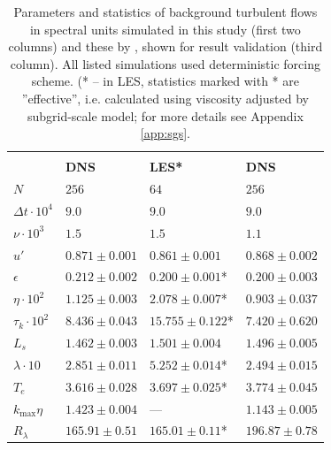 \documentclass{pracamgren}
\begin{document}
\begin{table}[h]
\centering
\begin{tabular}{llll}
 & & & \scriptsize{\textcite{Rosa2013}}  \\
 & \textbf{DNS} & \textbf{LES*} & \textbf{DNS}  \\ \hline
$N$ & $256$ & $64$ & $256$ \\
$\Delta t \cdot 10^{4}$ & $9.0$ & $9.0$ & $9.0$  \\
$\nu \cdot 10^{3}$ & $1.5$ & $1.5$ & $1.1$  \\

$u'$ & $0.871 \pm 0.001 $ & $0.861 \pm 0.001 $ & $0.868 \pm 0.002 $ \\
$\epsilon$ & $0.212 \pm 0.002 $ & $0.200 \pm 0.001$* & $0.200 \pm 0.003 $  \\

$\eta \cdot 10^{2}$ & $1.125 \pm 0.003$ & $2.078 \pm 0.007$* & $0.903 \pm 0.037$  \\
$\tau_{k} \cdot 10^{2}$ & $8.436 \pm 0.043$ & $15.755 \pm 0.122$* & $7.420 \pm 0.620$  \\
$L_{s}$ & $1.462 \pm 0.003$ & $1.501 \pm 0.004$ & $1.496 \pm 0.005$  \\
$\lambda \cdot 10$ & $2.851 \pm 0.011$ & $5.252 \pm 0.014$* & $2.494 \pm 0.015$  \\
$T_{e}$ & $3.616 \pm 0.028$ & $3.697 \pm 0.025$* & $3.774 \pm 0.045$  \\

$k_{\max} \eta$ & $1.423 \pm 0.004 $ & --- & $1.143 \pm 0.005 $  \\
$R_{\lambda}$ & $165.91 \pm 0.51 $ & $165.01 \pm 0.11$* & $196.87 \pm 0.78 $            
\end{tabular}
\caption{Parameters and statistics of background turbulent flows in spectral units simulated in this study (first two columns) and these by \textcite{Rosa2013}, shown for result validation (third column). All listed simulations used deterministic forcing scheme. (* -- in LES, statistics marked with * are ''effective'', i.e. calculated using viscosity adjusted by subgrid-scale model; for more details see Appendix \ref{app:sgs}.}
\label{tab:flow-stats}
\end{table}
\end{document}
